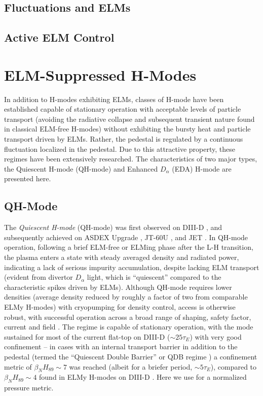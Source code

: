 \subsection{Fluctuations and ELMs}\label{subsec:hcr_elmy_fluct}

\subsection{Active ELM Control}\label{subsec:hcr_elmy_control}

\nicesectionending

\section{ELM-Suppressed H-Modes}\label{sec:hcr_elmsuppressed}

In addition to H-modes exhibiting ELMs, classes of H-mode have been established capable of stationary operation with acceptable levels of particle transport (avoiding the radiative collapse and subsequent transient nature found in classical ELM-free H-modes) without exhibiting the bursty heat and particle transport driven by ELMs.  Rather, the pedestal is regulated by a continuous fluctuation localized in the pedestal.  Due to this attractive property, these regimes have been extensively researched.  The characteristics of two major types, the Quiescent H-mode (QH-mode) and Enhanced $D_\alpha$ (EDA) H-mode are presented here.

\subsection{QH-Mode}\label{subsec:hcr_qh}

The \emph{Quiescent H-mode} (QH-mode) was first observed on DIII-D \cite{Burrell2002,Groebner2001}, and subsequently achieved on ASDEX Upgrade \cite{Suttrop2003a}, JT-60U \cite{Sakamoto2004}, and JET \cite{Suttrop2005}.  In QH-mode operation, following a brief ELM-free or ELMing phase after the L-H transition, the plasma enters a state with steady averaged density and radiated power, indicating a lack of serious impurity accumulation, despite lacking ELM transport (evident from divertor $D_\alpha$ light, which is ``quiescent'' compared to the characteristic spikes driven by ELMs).  Although QH-mode requires lower densities (average density reduced by roughly a factor of two from comparable ELMy H-modes) with cryopumping for density control, access is otherwise robust, with successful operation across a broad range of shaping, safety factor, current and field \cite{Burrell2002}.  The regime is capable of stationary operation, with the mode sustained for most of the current flat-top on DIII-D ($\sim 25 \tau_E$)
 with very good confinement -- in cases with an internal transport barrier in addition to the pedestal (termed the ``Quiescent Double Barrier'' or QDB regime \cite{Burrell2001,Doyle2001,Greenfield2002}) a confinement metric of $\beta_N H_{89} \sim 7$ was reached (albeit for a briefer period, $\sim 5 \tau_E$), compared to $\beta_N H_{89} \sim 4$ found in ELMy H-modes on DIII-D \cite{Doyle2001}.  Here we use for a normalized pressure metric.

